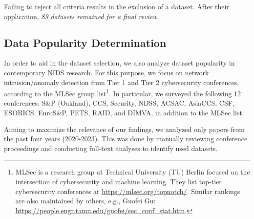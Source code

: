 \noindent Failing to reject all criteria results in the exclusion of a dataset. After their application, \emph{89 datasets remained for a final review}.


\subsection{Data Popularity Determination}
\label{assec:meth_popularity_determination}

In order to aid in the dataset selection, we also analyze dataset popularity in contemporary NIDS research. For this purpose, we focus on network intrusion/anomaly detection from Tier 1 and Tier 2 cybersecurity conferences, according to the MLSec group list\footnote{MLSec is a research group at Technical University (TU) Berlin focused on the intersection of cybersecurity and machine learning. They list top-tier cybersecurity conferences at \url{https://mlsec.org/topnotch/}. Similar rankings are also maintained by others, e.g., Guofei Gu: \url{https://people.engr.tamu.edu/guofei/sec_conf_stat.htm}.}. In particular, we surveyed the following 12 conferences: S\&P (Oakland), CCS, Security, NDSS, ACSAC, AsiaCCS, CSF, ESORICS, EuroS\&P, PETS, RAID, and DIMVA, in addition to the MLSec list.

Aiming to maximize the relevance of our findings, we analyzed only papers from the past four years (2020-2023). This was done by manually reviewing conference proceedings and conducting full-text analyses to identify used datasets.